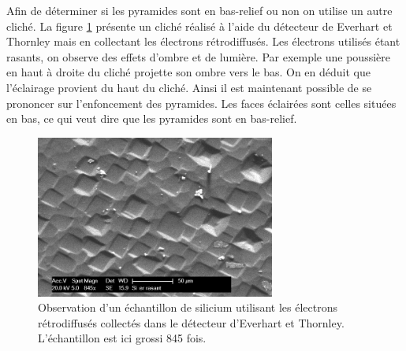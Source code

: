 \documentclass[a4paper,12pt]{article}
\newcommand\ett{Everhart et Thornley\xspace}
\begin{document}
Afin de déterminer si les pyramides sont en bas-relief ou non on utilise un autre cliché. La figure \ref{fig:si_er_rasant} présente
un cliché réalisé à l'aide du détecteur de \ett mais en collectant les électrons rétrodiffusés. Les électrons utilisés étant rasants,
on observe des effets d'ombre et de lumière. Par exemple une poussière en haut à droite du cliché projette son ombre vers le bas.
On en déduit que l'éclairage provient du haut du cliché. Ainsi il est maintenant possible de se prononcer sur l'enfoncement des pyramides.
Les faces éclairées sont celles situées en bas, ce qui veut dire que les pyramides sont en bas-relief.

\begin{figure}
\centering
\includegraphics[width=0.7\textwidth]{images/si_er_rasant.png}
\caption{Observation d'un échantillon de silicium utilisant les électrons rétrodiffusés collectés dans le détecteur d'\ett. L'échantillon est ici grossi 845 fois.}
\label{fig:si_er_rasant}
\end{figure}
\end{document}

